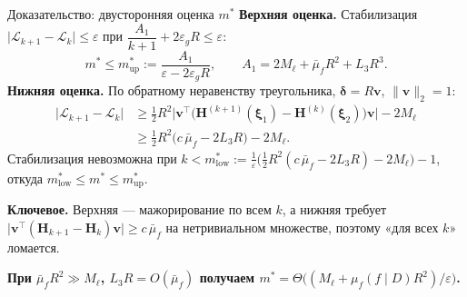 \documentclass[9pt,pdf,hyperref={unicode}]{beamer}
\newcommand{\key}[1]{\par\vspace{0.5ex}\noindent\textbf{\color{darkgreen}#1}}
\begin{document}
\begin{frame}{Доказательство: двусторонняя оценка $m^*$}
\justifying
\footnotesize
\vspace{-2pt}
\textbf{Верхняя оценка.} Стабилизация $\bigl|\mathcal{L}_{k+1}-\mathcal{L}_k\bigr|\le\varepsilon$ при $\dfrac{A_1}{k+1}+2\varepsilon_gR\le\varepsilon$:
\[
    m^*\le m^*_{\mathrm{up}}:=\frac{A_1}{\varepsilon-2\varepsilon_gR},\qquad A_1=2M_\ell+\bar\mu_f R^2+L_3 R^3 .
\]
\textbf{Нижняя оценка.} По обратному неравенству треугольника, $\boldsymbol{\delta}=R\mathbf{v}$, $\|\mathbf{v}\|_2=1$:
\begin{align*}
    \bigl|\mathcal{L}_{k+1}-\mathcal{L}_k\bigr|
    &\ge\tfrac12 R^2\bigl|\mathbf{v}^{\top}\bigl(\mathbf{H}^{(k+1)}(\boldsymbol{\xi}_1)-\mathbf{H}^{(k)}(\boldsymbol{\xi}_2)\bigr)\mathbf{v}\bigr|-2M_\ell\\
    &\ge\tfrac12 R^2\bigl(c\,\bar\mu_f-2L_3R\bigr)-2M_\ell .
\end{align*}
Стабилизация невозможна при $k<m^*_{\mathrm{low}}:=\tfrac{1}{\varepsilon}\bigl(\tfrac12 R^2(c\,\bar\mu_f-2L_3R)-2M_\ell\bigr)-1$, откуда $m^*_{\mathrm{low}}\le m^*\le m^*_{\mathrm{up}}$.

\textbf{Ключевое.} Верхняя --- мажорирование по всем $k$, а нижняя требует $\bigl|\mathbf{v}^{\top}(\mathbf{H}_{k+1}-\mathbf{H}_k)\mathbf{v}\bigr|\ge c\,\bar\mu_f$ на нетривиальном множестве, поэтому «для всех $k$» ломается.
\vspace{-2pt}
\begin{center}
\end{center}
\vspace{-6pt}
\key{При $\bar\mu_f R^2\gg M_\ell$, $L_3R=O(\bar\mu_f)$ получаем $m^*=\Theta\bigl((M_\ell+\mu_f(f\mid D)R^2)/\varepsilon\bigr)$.}
\end{frame}
\end{document}
